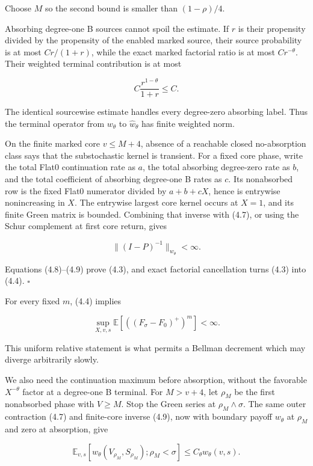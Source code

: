 Choose \(M\) so the second bound is smaller than \((1-\rho)/4\).

Absorbing degree-one B sources cannot spoil the estimate. If \(r\) is
their propensity divided by the propensity of the enabled marked source,
their source probability is at most \(Cr/(1+r)\), while the exact marked
factorial ratio is at most \(Cr^{-\theta}\). Their weighted terminal
contribution is at most

\[
                         C\frac{r^{1-\theta}}{1+r}\le C. \tag{4.8}
\]

The identical sourcewise estimate handles every degree-zero absorbing
label. Thus the terminal operator from \(w_\theta\) to
\(\widehat w_\theta\) has finite weighted norm.

On the finite marked core \(v\le M+4\), absence of a reachable closed
no-absorption class says that the substochastic kernel is transient. For
a fixed core phase, write the total Flat0 continuation rate as \(a\),
the total absorbing degree-zero rate as \(b\), and the total coefficient
of absorbing degree-one B rates as \(c\). Its nonabsorbed row is the
fixed Flat0 numerator divided by \(a+b+cX\), hence is entrywise
nonincreasing in \(X\). The entrywise largest core kernel occurs at
\(X=1\), and its finite Green matrix is bounded. Combining that inverse
with (4.7), or using the Schur complement at first core return, gives

\[
                         \|(I-P)^{-1}\|_{w_\theta}<\infty. \tag{4.9}
\]

Equations (4.8)--(4.9) prove (4.3), and exact factorial cancellation
turns (4.3) into (4.4). \(\square\)

For every fixed \(m\), (4.4) implies

\[
          \sup_{X,v,s}\mathbb E[((F_\sigma-F_0)^+)^m]<\infty.
                                                               \tag{4.10}
\]

This uniform relative statement is what permits a Bellman decrement
which may diverge arbitrarily slowly.

We also need the continuation maximum before absorption, without the
favorable \(X^{-\theta}\) factor at a degree-one B terminal. For
\(M>v+4\), let \(\rho_M\) be the first nonabsorbed phase with
\(V\ge M\). Stop the Green series at \(\rho_M\wedge\sigma\). The same
outer contraction (4.7) and finite-core inverse (4.9), now with boundary
payoff \(w_\theta\) at \(\rho_M\) and zero at absorption, give

\[
 \mathbb E_{v,s}\!\left[
    w_\theta(V_{\rho_M},S_{\rho_M});\rho_M<\sigma
 \right]\le C_\theta w_\theta(v,s).                 \tag{4.11}
\]

